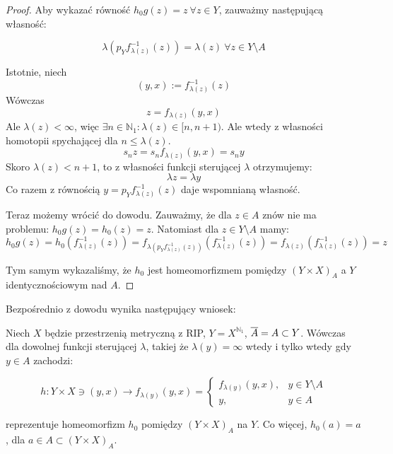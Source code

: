\begin{thm}
\begin{proof}
    Aby wykazać równość $h_0g(z) = z\ \forall z \in Y$, zauważmy następującą własność:
    
    \[\lambda(p_Y f_{\lambda(z)}^{-1}(z)) = \lambda(z)\ \forall z \in Y \setminus A\]
    
    Istotnie, niech
    \[(y,x) := f_{\lambda(z)}^{-1}(z)\]
    Wówczas
    \[z = f_{\lambda(z)}(y,x)\]
    Ale $\lambda(z) < \infty$, więc $\exists n \in \mathbb{N}_1: \lambda(z) \in [n, n+1)$. Ale wtedy z własności homotopii spychającej dla $n \leq \lambda(z)$.
    \[s_n z = s_n f_{\lambda(z)}(y,x) = s_n y\]
    Skoro $\lambda(z) < n+1$, to z własności funkcji sterującej $\lambda$ otrzymujemy:
    \[\lambda z = \lambda y\]
    Co razem z równością $y = p_Y f_{\lambda(z)}^{-1}(z)$ daje wspomnianą własność.
    
    Teraz możemy wrócić do dowodu. Zauważmy, że dla $z \in A$ znów nie ma problemu: $h_0g(z) = h_0(z) = z$. Natomiast dla $z \in Y \setminus A$ mamy:
    \[h_0g(z) = h_0(f_{\lambda(z)}^{-1}(z)) = f_{\lambda(p_Y f_{\lambda(z)}^{-1}(z))}(f_{\lambda(z)}^{-1}(z)) = f_{\lambda(z)}(f_{\lambda(z)}^{-1}(z)) = z\]
    
    Tym samym wykazaliśmy, że $h_0$ jest homeomorfizmem pomiędzy $(Y \times X)_A$ a $Y$ identycznościowym nad $A$.
  \end{proof}
\end{thm}


Bezpośrednio z dowodu wynika następujący wniosek:
\begin{cor}
  Niech $X$ będzie przestrzenią metryczną z RIP, $Y = X^{\mathbb{N}_1}$, $\overline{A} = A \subset Y$.
  Wówczas dla dowolnej funkcji sterującej $\lambda$, takiej że $\lambda(y) = \infty$ wtedy i tylko wtedy gdy $y \in A$ zachodzi:
  
  \[h: Y \times X \ni (y,x) \rightarrow f_{\lambda(y)}(y,x) = 
    \begin{cases}
      f_{\lambda(y)}(y,x),&y \in Y \setminus A \\
      y,&y \in A
    \end{cases}\]
  
  reprezentuje homeomorfizm $h_0$ pomiędzy $(Y \times X)_A$ na $Y$. Co więcej, $h_0(a) = a$, dla $a \in A \subset (Y \times X)_A$.
\end{cor}

